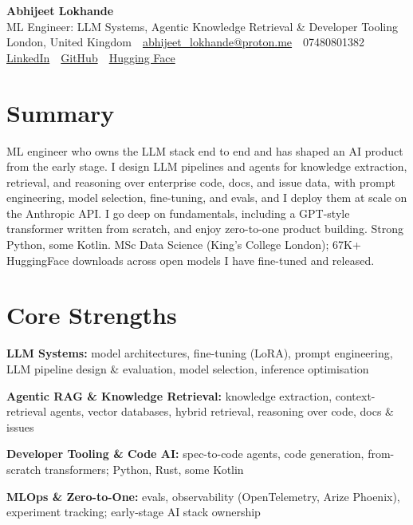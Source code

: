 \documentclass[10pt,a4paper]{article}
\newcommand{\sep}{\,\textcolor{accent!60}{\textbar}\,}
\begin{document}
\begin{center}
  {\fontsize{24}{26}\selectfont\bfseries Abhijeet Lokhande}\\[3pt]
  {\color{accent}\large ML Engineer: LLM Systems, Agentic Knowledge Retrieval \& Developer Tooling}\\[5pt]
  {\small
    London, United Kingdom \sep
    \href{mailto:abhijeet_lokhande@proton.me}{abhijeet\_lokhande@proton.me} \sep
    07480801382 \\[2pt]
    \href{https://www.linkedin.com/in/ablds/}{LinkedIn} \sep
    \href{https://github.com/abhijeetscode}{GitHub} \sep
    \href{https://huggingface.co/ab-ai}{Hugging Face}
  }
\end{center}
\vspace{2pt}

\section{Summary}
ML engineer who owns the LLM stack end to end and has shaped an AI product from the early stage. I design LLM pipelines and agents for knowledge extraction, retrieval, and reasoning over enterprise code, docs, and issue data, with prompt engineering, model selection, fine-tuning, and evals, and I deploy them at scale on the Anthropic API. I go deep on fundamentals, including a GPT-style transformer written from scratch, and enjoy zero-to-one product building. Strong Python, some Kotlin. MSc Data Science (King's College London); 67K+ HuggingFace downloads across open models I have fine-tuned and released.

\section{Core Strengths}
\begin{tight}
  \item[\textcolor{accent}{\small$\bullet$}] \textbf{LLM Systems:} model architectures, fine-tuning (LoRA), prompt engineering, LLM pipeline design \& evaluation, model selection, inference optimisation
  \item[\textcolor{accent}{\small$\bullet$}] \textbf{Agentic RAG \& Knowledge Retrieval:} knowledge extraction, context-retrieval agents, vector databases, hybrid retrieval, reasoning over code, docs \& issues
  \item[\textcolor{accent}{\small$\bullet$}] \textbf{Developer Tooling \& Code AI:} spec-to-code agents, code generation, from-scratch transformers; Python, Rust, some Kotlin
  \item[\textcolor{accent}{\small$\bullet$}] \textbf{MLOps \& Zero-to-One:} evals, observability (OpenTelemetry, Arize Phoenix), experiment tracking; early-stage AI stack ownership
\end{tight}
\end{document}
